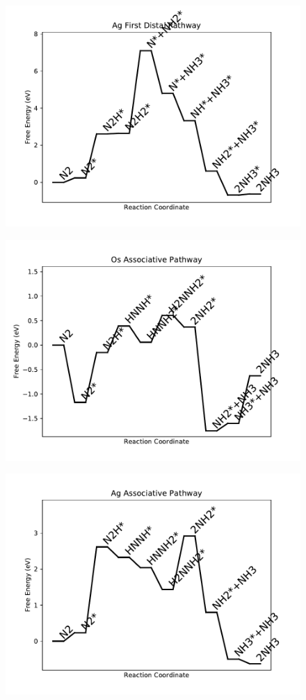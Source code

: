 \begin{figure}
\includegraphics[width=0.8\linewidth]{data/plots/Ag_distal_1.pdf}
\label{fig:Ag_distal_1}
\end{figure}

\begin{figure}
\includegraphics[width=0.8\linewidth]{data/plots/Os_associative.pdf}
\label{fig:Os_associative}
\end{figure}

\begin{figure}
\includegraphics[width=0.8\linewidth]{data/plots/Ag_associative.pdf}
\label{fig:Ag_associative}
\end{figure}


